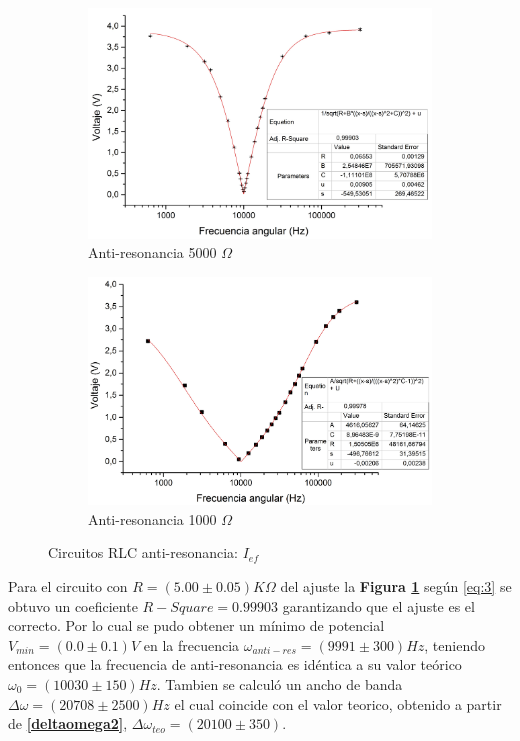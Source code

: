 \documentclass[11pt,a4paper]{article}
\begin{document}
\begin{figure}[h]

\begin{subfigure}{0.5\textwidth}
\includegraphics[scale=0.31]{RLC_ARES_5000_VvsF}
  \caption{Anti-resonancia 5000 $\Omega$}
  \label{subfig:ARES_I.a}
\end{subfigure}
\begin{subfigure}{0.5\textwidth}
\includegraphics[scale=0.3]{RLC_ARES_1000_VvsF}
  \caption{Anti-resonancia 1000 $\Omega$}
  \label{subfig:ARES_I.b}
\end{subfigure}
  \caption{Circuitos RLC anti-resonancia: $I_{ef}$}
  \label{fig:ARES_I}
\end{figure}

Para el circuito con $R=(5.00 \pm 0.05)K\Omega$ del ajuste la \textbf{Figura \ref{subfig:ARES_I.a}} según \eqref{eq:3} se obtuvo un coeficiente $R-Square = 0.99903$ garantizando que el ajuste es el correcto. Por lo cual se pudo obtener un mínimo de potencial $V_{min} = (0.0 \pm 0.1)V$ en la frecuencia $\omega_{anti-res} = (9991 \pm 300) Hz$, teniendo entonces que la frecuencia de anti-resonancia es idéntica 
a su valor teórico $\omega_0 = (10030 \pm 150) Hz$. Tambien se calculó un ancho de banda $\Delta\omega = (20708 \pm 2500) Hz$ el cual coincide con el valor teorico, obtenido a partir de \textbf{\eqref{deltaomega2}}, $\Delta\omega_{teo}=(20100 \pm 350)$.
\end{document}
